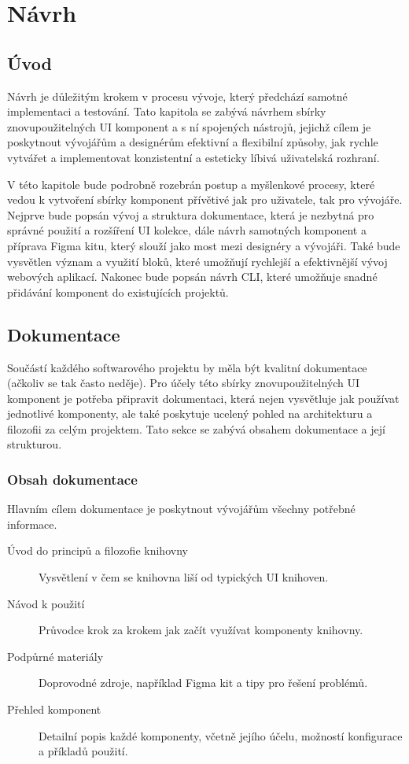 
\chapter{Návrh}

\section{Úvod}
Návrh je důležitým krokem v procesu vývoje, který předchází samotné implementaci a testování. Tato kapitola se zabývá návrhem sbírky znovupoužitelných UI komponent a s ní spojených nástrojů, jejichž cílem je poskytnout vývojářům a designérům efektivní a flexibilní způsoby, jak rychle vytvářet a implementovat konzistentní a esteticky líbivá uživatelská rozhraní.

V této kapitole bude podrobně rozebrán postup a myšlenkové procesy, které vedou k vytvoření sbírky komponent přívětivé jak pro uživatele, tak pro vývojáře. Nejprve bude popsán vývoj a struktura dokumentace, která je nezbytná pro správné použití a rozšíření UI kolekce, dále návrh samotných komponent a příprava Figma kitu, který slouží jako most mezi designéry a vývojáři. Také bude vysvětlen význam a využití bloků, které umožňují rychlejší a efektivnější vývoj webových aplikací. Nakonec bude popsán návrh CLI, které umožňuje snadné přidávání komponent do existujících projektů.

\section{Dokumentace}
Součástí každého softwarového projektu by měla být kvalitní dokumentace (ačkoliv se tak často neděje). Pro účely této sbírky znovupoužitelných UI komponent je potřeba připravit dokumentaci, která nejen vysvětluje jak používat jednotlivé komponenty, ale také poskytuje ucelený pohled na architekturu a filozofii za celým projektem. Tato sekce se zabývá obsahem dokumentace a její strukturou.

\subsection{Obsah dokumentace}
Hlavním cílem dokumentace je poskytnout vývojářům všechny potřebné informace.

\begin{description}
  \item[Úvod do principů a filozofie knihovny] Vysvětlení v čem se knihovna liší od typických UI knihoven.
  \item[Návod k použití] Průvodce krok za krokem jak začít využívat komponenty knihovny.
  \item[Podpůrné materiály] Doprovodné zdroje, například Figma kit a tipy pro řešení problémů.
  \item[Přehled komponent] Detailní popis každé komponenty, včetně jejího účelu, možností konfigurace a příkladů použití.
\end{description}

